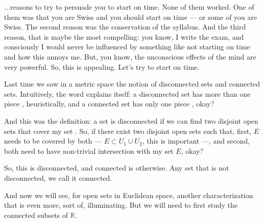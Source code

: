 \begin{speech}[00:00:00 - 00:02:08]
...reasons to try to persuade you to start on time. None of them worked. One of them was that you are Swiss and you should start on time --- or some of you are Swiss. The second reason was the conservation of the syllabus. And the third reason, that is maybe the most compelling: you know, I write the exam, and consciously I would never be influenced by something like not starting on time and how this annoys me. But, you know, the unconscious effects of the mind are very powerful. So, this is appealing. Let's try to start on time.

Last time we saw in a metric space the notion of disconnected sets and connected sets. Intuitively, the word explains itself: a disconnected set has more than one piece , heuristically, and a connected set has only one piece , okay?

And this was the definition: a set is disconnected if we can find two disjoint open sets that cover my set . So, if there exist two disjoint open sets such that, first, $E$ needs to be covered by both --- $E \subset U_1 \cup U_2$, this is important ---, and second, both need to have non-trivial intersection with my set $E$, okay?

So, this is disconnected, and connected is otherwise. Any set that is not disconnected, we call it connected.

And now we will see, for open sets in Euclidean space, another characterization that is even more, sort of, illuminating. But we will need to first study the connected subsets of $\mathbb{R}$.
\end{speech}

